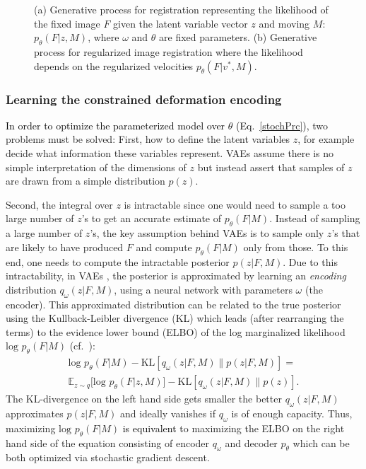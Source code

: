 \documentclass[journal]{IEEEtran}
\newcommand{\update}[1]{\textcolor{black}{#1}}
\begin{document}
\begin{figure}[tb]
\centering 
{}\hfill
{}
\caption{\small{(a) Generative process for registration representing the likelihood of the fixed image $F$ given the latent variable vector $z$ and moving $M$: $p_\theta(F|z,M)$, where $\omega$ and $\theta$ are fixed parameters. (b) Generative process for regularized image registration where the likelihood depends on the regularized velocities $p_\theta(F|v^*,M)$.}}
\end{figure}


\subsubsection{Learning the constrained deformation encoding}
\update{In order to optimize the parameterized model over $\theta$ (Eq.~\ref{stochPrc}),} two problems must be solved: First, how to define the latent variables $z$, for example decide what information these variables represent. VAEs assume there is no simple interpretation of the dimensions of $z$ but instead assert that samples of $z$ are drawn from a simple distribution $p(z)$. 

Second, the integral over $z$ is intractable since one would need to sample a too large number of $z$'s to get an accurate estimate of $p_\theta(F|M)$. Instead of sampling a large number of $z$'s, the key assumption behind VAEs is to sample only $z$'s that are likely to have produced $F$ and compute $p_\theta(F|M)$ only from those. To this end, one needs to compute the intractable posterior $p(z|F,M)$. Due to this intractability, in VAEs \cite{kingma2013auto}, the posterior is approximated by learning an \emph{encoding} distribution $q_\omega(z|F,M)$, using a neural network with parameters $\omega$ (the encoder). This approximated distribution can be related to the true posterior using the Kullback-Leibler divergence (KL) which leads (after rearranging the terms) to the evidence lower bound (ELBO) of the log marginalized likelihood $\text{log } p_\theta(F|M)$ (cf.~\cite{kingma2013auto,kingma2014semi}):
\begin{multline}\label{objective}
\text{log } p_\theta(F|M) - \text{KL}\left[q_\omega(z|F,M)\| p(z|F,M) \right] = \\ 
\mathbb{E}_{z\sim q}\Big[\text{log } p_\theta(F|z,M) \Big] - \text{KL}\left[q_\omega(z|F,M)\| p(z) \right].
\end{multline}
The KL-divergence on the left hand side gets smaller the better $q_\omega(z|F,M)$ approximates $p(z|F,M)$ and ideally vanishes if $q_\omega$ is of enough capacity. Thus, maximizing $\text{log } p_\theta(F|M)$ \update{is equivalent} to maximizing the ELBO on the right hand side of the equation consisting of encoder $q_\omega$ and decoder $p_\theta$ which can be both optimized via stochastic gradient descent.
\end{document}
